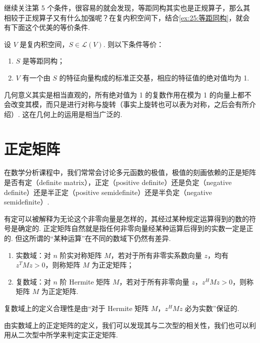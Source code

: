 继续关注第 5 个条件，很容易的就会发现，等距同构其实也是正规算子，那么其相较于正规算子又有什么加强呢？在复内积空间下，结合\autoref{ex:25:等距同构}，就会有下面这个优美的等价条件.

\begin{theorem}
    设 $ V $ 是复内积空间，$ S \in \mathcal{L}(V) $. 则以下条件等价：
    \begin{enumerate}
        \item $ S $ 是等距同构；

        \item $ V $ 有一个由 $ S $ 的特征向量构成的标准正交基，相应的特征值的绝对值均为 1.
    \end{enumerate}
\end{theorem}

几何意义其实是相当直观的，所有绝对值为 1 的复数作用在模为 1 的向量上都不会改变其模，而只是进行对称与旋转（事实上旋转也可以表为对称，之后会有所介绍）. 这在几何上的运用是相当广泛的.

\section{正定矩阵}

在数学分析课程中，我们常常会讨论多元函数的极值，极值的刻画依赖的正是矩阵是否有定（definite matrix），正定（positive definite）还是负定（negative definite）还是半正定（positive semidefinite）还是半负定（negative semidefinite）.

有定可以被解释为无论这个非零向量是怎样的，其经过某种规定运算得到的数的符号是确定的. 正定矩阵自然就是指任何非零向量经某种运算后得到的实数一定是正的. 但这所谓的``某种运算''在不同的数域下仍然有差异.

\begin{definition}
    \begin{enumerate}
        \item 实数域：对 $ n $ 阶实对称矩阵 $ M $，若对于所有非零实系数向量 $ z $，均有$ z^{T}Mz > 0 $，则称矩阵 $ M $ 为正定矩阵；

        \item 复数域：对 $ n $ 阶 Hermite 矩阵 $ M $，若对于所有非零向量 $ z $，$ z^{H}Mz > 0 $，则称矩阵 $ M $ 为正定矩阵.
    \end{enumerate}
\end{definition}

复数域上的定义合理性是由``对于 Hermite 矩阵 $ M $，$ z^{H}Mz $ 必为实数''保证的.

由实数域上的正定矩阵的定义，我们可以发现其与二次型的相关性，我们也可以利用从二次型中所学来判定实正定矩阵.

